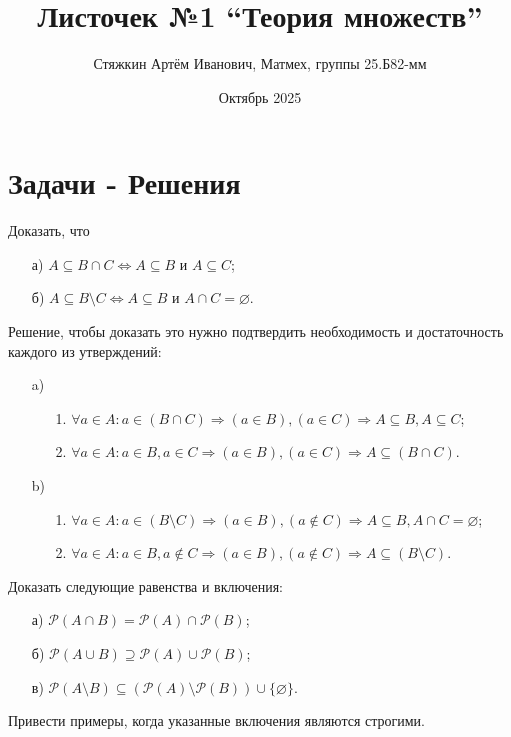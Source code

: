 \documentclass{article}
\title{Листочек №1 ``Теория множеств''}
\author{Стяжкин Артём Иванович, Матмех, группы 25.Б82-мм}
\date{Октябрь 2025}
\begin{document}
\maketitle

\section{Задачи - Решения}

\begin{task}[1]
Доказать, что
\begin{enumerate}
    \item[а)] $A \subseteq B \cap C \Leftrightarrow A \subseteq B$ и $A \subseteq C$;
    \item[б)] $A \subseteq B \setminus C \Leftrightarrow A \subseteq B$ и $A \cap C = \varnothing$.
\end{enumerate}
\end{task}

\begin{solution}[1]
Решение, чтобы доказать это нужно подтвердить необходимость и достаточность каждого из утверждений:
\begin{enumerate}
	\item[a)] \begin{enumerate}
	\item[1.] $ \forall a \in A : a \in ( B \cap C ) \Rightarrow ( a \in B ), ( a \in C ) \Rightarrow A \subseteq B, A \subseteq C$;
	\item[2.] $ \forall a \in A : a \in B, a \in C \Rightarrow (a \in B), (a \in C) \Rightarrow A \subseteq (B \cap C)$.
	\end{enumerate}
	\item[b)] \begin{enumerate}
	\item[1.] $ \forall a \in A : a \in (B \setminus C) \Rightarrow (a \in B), (a \notin C) \Rightarrow A \subseteq B, A \cap C = \varnothing$;
	\item[2.] $ \forall a \in A : a \in B, a \notin C \Rightarrow (a \in B), (a \notin C) \Rightarrow A \subseteq (B \setminus C)$.
	\end{enumerate}
\end{enumerate}
\end{solution}

\begin{task}[2]
Доказать следующие равенства и включения:
\begin{enumerate}
    \item[а)] $\mathcal{P}(A \cap B) = \mathcal{P}(A) \cap \mathcal{P}(B)$;
    \item[б)] $\mathcal{P}(A \cup B) \supseteq \mathcal{P}(A) \cup \mathcal{P}(B)$;
    \item[в)] $\mathcal{P}(A \setminus B) \subseteq (\mathcal{P}(A) \setminus \mathcal{P}(B)) \cup \{\varnothing\}$.
\end{enumerate}
Привести примеры, когда указанные включения являются строгими.
\end{task}
\end{document}
